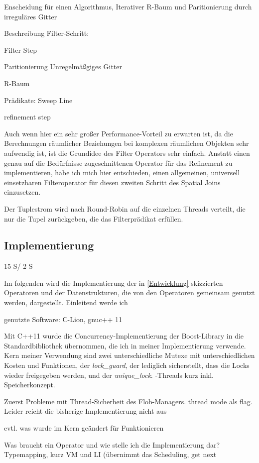 \documentclass[a4paper,12pt,twoside]{article}
\newcommand{\Fb}[1]{\textit{#1}} %
\begin{document}
Enscheidung für einen Algorithmus, Iterativer R-Baum und Paritionierung durch irreguläres Gitter

Beschreibung Filter-Schritt: 

Filter Step

Paritionierung Unregelmäßgiges Gitter

R-Baum

Prädikate: Sweep Line

refinement step

Auch wenn hier ein sehr großer Performance-Vorteil zu erwarten ist, da die Berechnungen räumlicher Beziehungen bei komplexen räumlichen Objekten sehr aufwendig ist, ist die Grundidee des Filter Operators sehr einfach. Anstatt einen genau auf die Bedürfnisse zugeschnittenen Operator für das Refinement zu implementieren, habe ich mich hier entschieden, einen allgemeinen, universell einsetzbaren Filteroperator für diesen zweiten Schritt des Spatial Joins einzusetzen. 

Der Tuplestrom wird nach Round-Robin auf die einzelnen Threads verteilt, die nur die Tupel zurückgeben, die das Filterprädikat erfüllen.

\subsection{Implementierung} 15 S/ 2 S
\label{Implemeniterung} 

Im folgenden wird die Implementierung der in \autoref{Entwicklung} skizzierten Operatoren und der Datenstrukturen, die von den Operatoren gemeinsam genutzt werden, dargestellt. Einleitend werde ich 

genutzte Software: C-Lion, gnuc++ 11

Mit C++11 wurde die Concurrency-Implementierung der Boost-Library in die Standardbibliothek übernommen, die ich in meiner Implementierung verwende. Kern meiner Verwendung sind zwei unterschiedliche Mutexe mit unterschiedlichen Kosten und Funktionen, der \Fb{lock\_guard}, der lediglich sicherstellt, dass die Locks wieder freigegeben werden, und der \Fb{unique\_lock}. -Threads kurz inkl. Speicherkonzept.

Zuerst Probleme mit Thread-Sicherheit des Flob-Managers. thread mode als flag. Leider reicht die bisherige Implementierung nicht aus

evtl. was wurde im Kern geändert für Funktionieren

Was braucht ein Operator und wie stelle ich die Implementierung dar? Typemapping, kurz VM und LI (übernimmt das Scheduling, get next
\end{document}
